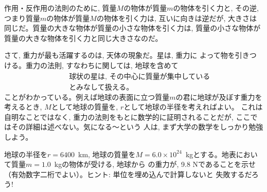 作用・反作用の法則のために, 質量$M$の物体が質量$m$の物体を引く力と, 
その逆, つまり質量$m$の物体が質量$M$の物体を引く力は, 互いに向きは逆だが, 
大きさは同じだ。質量の大きな物体が質量の小さな物体を引く力は, 
質量の小さな物体が質量の大きな物体を引く力と同じ大きさなのだ。

さて, 重力が最も活躍するのは, 天体の現象だ。星は, 重力に
よって物を引きつける。重力の法則, すなわちに関しては, 地球を含めて
\begin{eqnarray}
&&\text{球状の星は, その中心に質量が集中している}\nonumber\\
&&\text{とみなして扱える。}\label{eq:sphere_approx_gravity}
\end{eqnarray}
ことがわかっている。例えば地球の表面に立つ質量$m$の君に地球が及ぼす重力を考えるとき, 
$M$として地球の質量を, $r$として地球の半径を考えればよい。
これは自明なことではなく, 重力の法則をもとに数学的に証明されることだが, 
ここではその詳細は述べない。気になる〜という
人は, まず大学の数学をしっかり勉強しよう。\mv

\begin{q}\label{q:grav_accel}
地球の半径を$r=6400$~km, 
地球の質量を$M=6.0×10^{24}$~kgとする。地表において質量$m=1.0$~kgの物体が受ける, 地球から
の重力が, 9.8 Nであることを示せ（有効数字二桁でよい）。ヒント: 単位を埋め込んで計算しないと
失敗するだろう!
\end{q}
\mv

